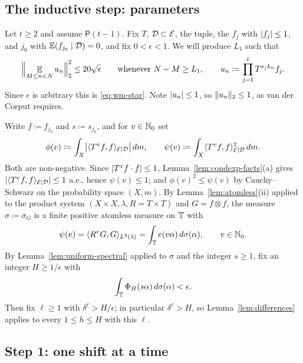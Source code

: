\subsection*{The inductive step: parameters}

Let $t \geq 2$ and assume $\mathsf P(t-1)$.  Fix $T$, $\mathcal{D} \subset \mathcal{E}$, the tuple, the
$f_j$ with $\lvert f_j \rvert \leq 1$, and $j_0$ with $\mathbb{E}(f_{j_0}\mid\mathcal{D}) = 0$, and fix
$0 < \epsilon < 1$.  We will produce $L_1$ such that
\begin{equation}
  \label{eq:wm-target}
  \Bigl\lVert \mathop{\mathbb{E}}_{M \leq n < N} u_n \Bigr\rVert_2^2 \leq 20\sqrt{\epsilon}
  \qquad \text{whenever } N - M \geq L_1 ,
  \qquad u_n \coloneqq \prod_{j=1}^{t} T^{s_j k_n} f_j .
\end{equation}
Since $\epsilon$ is arbitrary this is \eqref{eq:wm-star}.  Note $\lvert u_n \rvert \leq 1$, so
$\lVert u_n \rVert_2 \leq 1$, as van der Corput requires.

Write $f \coloneqq f_{j_0}$ and $s \coloneqq s_{j_0}$, and for $v \in \mathbb{N}_0$ set
\begin{equation}
  \label{eq:phipsi}
  \phi(v) \coloneqq \int_X \bigl\lvert \langle T^v f, f \rangle_{\mathcal{E} \mid \mathcal{D}} \bigr\rvert \, dm , \qquad
  \psi(v) \coloneqq \int_X \langle T^v f, f \rangle_{\mathcal{E} \mid \mathcal{D}}^2 \, dm .
\end{equation}
Both are non-negative.  Since $\lvert T^vf \cdot f \rvert \leq 1$,
Lemma~\ref{lem:condexp-facts}(a) gives $\lvert \langle T^vf, f \rangle_{\mathcal{E} \mid \mathcal{D}} \rvert \leq 1$ a.e., hence
$\psi(v) \leq 1$; and $\phi(v)^2 \leq \psi(v)$ by Cauchy--Schwarz on the probability space
$(X,m)$.  By Lemma~\ref{lem:atomless}(ii) applied to the product system
$(X \times X, \lambda, R = T \times T)$ and $G = f \otimes f$, the measure
$\sigma \coloneqq \sigma_G$ is a finite positive atomless measure on $\mathbb{T}$ with
\begin{equation}
  \label{eq:psi-spectral}
  \psi(v) = \langle R^v G, G \rangle_{L^2(\lambda)} = \int_{\mathbb{T}} e(v\alpha)\, d\sigma(\alpha),
  \qquad v \in \mathbb{N}_0 .
\end{equation}
By Lemma~\ref{lem:uniform-spectral} applied to $\sigma$ and the integer $s \geq 1$, fix an
integer $H \geq 1/\epsilon$ with
\begin{equation}
  \label{eq:Hchoice}
  \int_{\mathbb{T}} \Phi_H(s\alpha)\, d\sigma(\alpha) < \epsilon .
\end{equation}
Then fix $\ell \geq 1$ with $\delta^{\ell} > H/\epsilon$; in particular $\delta^{\ell} > H$, so
Lemma~\ref{lem:differences} applies to every $1 \leq h \leq H$ with this $\ell$.

\subsection*{Step 1: one shift at a time}

